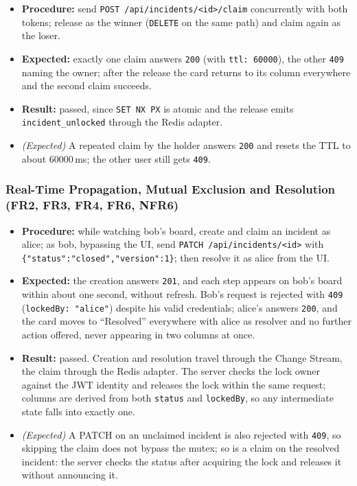 \documentclass{scrartcl}
\begin{document}
\begin{itemize}
  \item \textbf{Procedure:} send \texttt{POST /api/incidents/<id>/claim} concurrently with both tokens; release as the winner (\texttt{DELETE} on the same path) and claim again as the loser.
  \item \textbf{Expected:} exactly one claim answers \texttt{200} (with \texttt{ttl: 60000}), the other \texttt{409} naming the owner; after the release the card returns to its column everywhere and the second claim succeeds.
  \item \textbf{Result:} passed, since \texttt{SET NX PX} is atomic and the release emits \texttt{incident\_unlocked} through the Redis adapter.
  \item \emph{(Expected)} A repeated claim by the holder answers \texttt{200} and resets the TTL to about 60000\,ms; the other user still gets \texttt{409}.
\end{itemize}

\subsubsection{Real-Time Propagation, Mutual Exclusion and Resolution (FR2, FR3, FR4, FR6, NFR6)}

\begin{itemize}
  \item \textbf{Procedure:} while watching bob's board, create and claim an incident as alice; as bob, bypassing the UI, send \texttt{PATCH /api/incidents/<id>} with \texttt{\{"status":"closed","version":1\}}; then resolve it as alice from the UI.
  \item \textbf{Expected:} the creation answers \texttt{201}, and each step appears on bob's board within about one second, without refresh. Bob's request is rejected with \texttt{409} (\texttt{lockedBy: "alice"}) despite his valid credentials; alice's answers \texttt{200}, and the card moves to ``Resolved'' everywhere with alice as resolver and no further action offered, never appearing in two columns at once.
  \item \textbf{Result:} passed. Creation and resolution travel through the Change Stream, the claim through the Redis adapter. The server checks the lock owner against the JWT identity and releases the lock within the same request; columns are derived from both \texttt{status} and \texttt{lockedBy}, so any intermediate state falls into exactly one.
  \item \emph{(Expected)} A PATCH on an unclaimed incident is also rejected with \texttt{409}, so skipping the claim does not bypass the mutex; so is a claim on the resolved incident: the server checks the status after acquiring the lock and releases it without announcing it.
\end{itemize}
\end{document}
